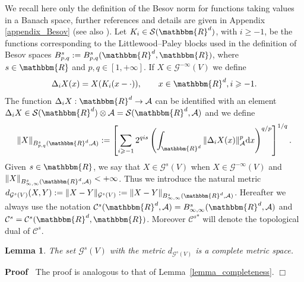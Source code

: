 \documentclass[11pt]{article}
\newcommand{\assign}{:=}
\newcommand{\asterisk}{\mathord{*}}
\newcommand{\mathd}{\mathrm{d}}
\newenvironment{proof}{\noindent\textbf{Proof\ }}{\hspace*{\fill}$\Box$\medskip}
\newtheorem{lemma}{Lemma}
\begin{document}
We recall here only the definition of the Besov norm for functions taking
values in a Banach space, further references and details are given in Appendix
\ref{appendix_Besov} (see also {\cite{Amann1997,Amann2019}}). Let $K_i \in
\mathcal{S} (\mathbbm{R}^d)$, with $i \geqslant - 1$, be the functions
corresponding to the Littlewood--Paley blocks used in the definition of Besov
spaces $B^s_{p, q} \assign B^s_{p, q} (\mathbbm{R}^d, \mathbbm{R})$, where $s
\in \mathbbm{R}$ and $p, q \in [1, + \infty]$. If $X \in \mathcal{G}^{- \infty}
(V)$ we define
\[ \Delta_i X (x) = X (K_i (x - \cdot)), \qquad x \in \mathbbm{R}^d, i
   \geqslant - 1. \]
The function $\Delta_i X : \mathbbm{R}^d \rightarrow \mathcal{A}$ can be
identified with an element $\Delta_i X \in \mathcal{S} (\mathbbm{R}^d) \otimes
\mathcal{A} = \mathcal{S} (\mathbbm{R}^d, \mathcal{A})$ and we define
\[ \| X \|_{B^s_{p, q} (\mathbbm{R}^d, \mathcal{A})} \assign \left[ \sum_{i
   \geqslant - 1} 2^{q i s} \left( \int_{\mathbbm{R}^d} \| \Delta_i X (x)
   \|_{\mathcal{A}}^p \mathd x \right)^{q / p}_{} \right]^{1 / q} . \]
Given $s \in \mathbbm{R}$, we say that $X \in \mathcal{G}^s (V)$ when $X \in
\mathcal{G}^{- \infty} (V)$ and $\| X \|_{B^s_{\infty, \infty} (\mathbbm{R}^d,
\mathcal{A})} < + \infty$. Thus we introduce the natural metric
$d_{\mathcal{G}^s (V)} (X, Y) \assign \| X - Y \|_{\mathcal{G}^s (V)} \assign
\| X - Y \|_{B^s_{\infty, \infty} (\mathbbm{R}^d, \mathcal{A})}$. Hereafter we
always use the notation $\mathcal{C}^s (\mathbbm{R}^d, \mathcal{A}) =
B^s_{\infty, \infty} (\mathbbm{R}^d, \mathcal{A})$ and $\mathcal{C}^s =
\mathcal{C}^s (\mathbbm{R}^d, \mathbbm{R})$. Moreover $\mathcal{C}^{s
\asterisk}$ will denote the topological dual of $\mathcal{C}^s$.

\begin{lemma}
  The set $\mathcal{G}^s (V)$ with the metric $d_{\mathcal{G}^s (V)}$ is a
  complete metric space.
\end{lemma}

\begin{proof}
  The proof is analogous to that of Lemma~\ref{lemma_completeness}.
\end{proof}
\end{document}

